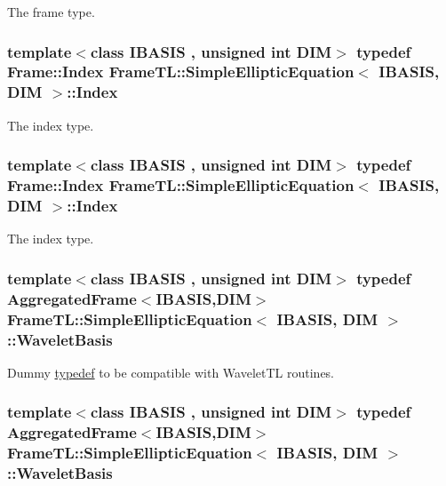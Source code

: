 The frame type. \hypertarget{classFrameTL_1_1SimpleEllipticEquation_763214b72b98926356eebe8b7f6da678}{
\subsubsection[{Index}]{\setlength{\rightskip}{0pt plus 5cm}template$<$class IBASIS , unsigned int DIM$>$ {\bf typedef} {\bf Frame::Index} {\bf FrameTL::SimpleEllipticEquation}$<$ IBASIS, DIM $>$::{\bf Index}}}
\label{classFrameTL_1_1SimpleEllipticEquation_763214b72b98926356eebe8b7f6da678}


The index type. \hypertarget{classFrameTL_1_1SimpleEllipticEquation_763214b72b98926356eebe8b7f6da678}{
\subsubsection[{Index}]{\setlength{\rightskip}{0pt plus 5cm}template$<$class IBASIS , unsigned int DIM$>$ {\bf typedef} {\bf Frame::Index} {\bf FrameTL::SimpleEllipticEquation}$<$ IBASIS, DIM $>$::{\bf Index}}}
\label{classFrameTL_1_1SimpleEllipticEquation_763214b72b98926356eebe8b7f6da678}


The index type. \hypertarget{classFrameTL_1_1SimpleEllipticEquation_59ee36b9fe6e6aab5b0947de8487c95e}{
\subsubsection[{WaveletBasis}]{\setlength{\rightskip}{0pt plus 5cm}template$<$class IBASIS , unsigned int DIM$>$ {\bf typedef} {\bf AggregatedFrame}$<$IBASIS,DIM$>$ {\bf FrameTL::SimpleEllipticEquation}$<$ IBASIS, DIM $>$::{\bf WaveletBasis}}}
\label{classFrameTL_1_1SimpleEllipticEquation_59ee36b9fe6e6aab5b0947de8487c95e}


Dummy \hyperlink{structtypedef}{typedef} to be compatible with WaveletTL routines. \hypertarget{classFrameTL_1_1SimpleEllipticEquation_59ee36b9fe6e6aab5b0947de8487c95e}{
\subsubsection[{WaveletBasis}]{\setlength{\rightskip}{0pt plus 5cm}template$<$class IBASIS , unsigned int DIM$>$ {\bf typedef} {\bf AggregatedFrame}$<$IBASIS,DIM$>$ {\bf FrameTL::SimpleEllipticEquation}$<$ IBASIS, DIM $>$::{\bf WaveletBasis}}}
\label{classFrameTL_1_1SimpleEllipticEquation_59ee36b9fe6e6aab5b0947de8487c95e}


